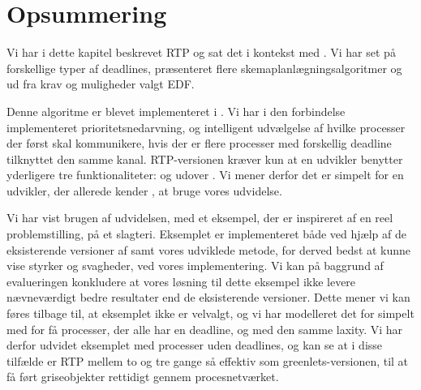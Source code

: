 \section{Opsummering}
Vi har i dette kapitel beskrevet RTP og sat det i kontekst med \pycsp. Vi har set på forskellige typer af deadlines, præsenteret flere skemaplanlægningsalgoritmer og ud fra krav og muligheder valgt EDF. 

Denne algoritme er blevet implementeret i \pycsp. Vi har i den forbindelse implementeret prioritetsnedarvning, og intelligent udvælgelse af hvilke processer der først skal kommunikere, hvis der er flere processer med forskellig deadline tilknyttet den samme kanal. RTP-versionen kræver kun at en udvikler benytter yderligere tre funktionaliteter:  og  udover \pycsp. Vi mener derfor det er simpelt for en udvikler, der allerede kender \pycsp, at bruge vores udvidelse.

Vi har vist brugen af udvidelsen, med et eksempel,  der er inspireret af en reel problemstilling, på et slagteri. Eksemplet er implementeret både ved hjælp af de eksisterende versioner af \pycsp  samt vores udviklede metode, for derved bedst at kunne vise styrker og svagheder, ved vores implementering. Vi kan på baggrund af evalueringen konkludere at vores løsning til dette eksempel ikke levere nævneværdigt bedre resultater end de eksisterende versioner. 
Dette mener vi kan føres tilbage til, at eksemplet ikke er velvalgt, og vi har modelleret det for simpelt med for få processer, der alle har en deadline, og med den samme laxity. Vi har derfor udvidet eksemplet med processer uden deadlines, og kan se at i disse tilfælde er RTP mellem to og tre gange så effektiv som greenlets-versionen, til at få ført griseobjekter rettidigt gennem procesnetværket.  







